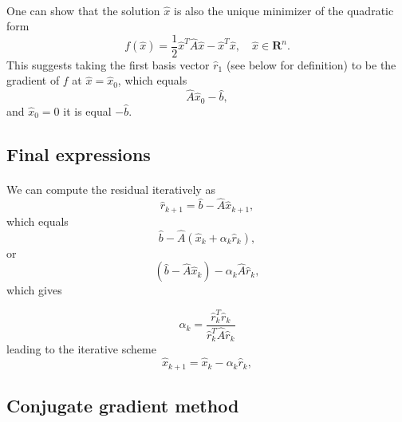 \documentclass[%
oneside,                 %
final,                   %
10pt]{article}
\begin{document}
\paragraph{}
One can show that the solution $\hat{x}$ is also the unique minimizer of the quadratic form
\begin{equation*}
  f(\hat{x}) = \frac{1}{2}\hat{x}^T\hat{A}\hat{x} - \hat{x}^T \hat{x} , \quad \hat{x}\in\mathbf{R}^n. 
\end{equation*}
This suggests taking the first basis vector $\hat{r}_1$ (see below for definition) 
to be the gradient of $f$ at $\hat{x}=\hat{x}_0$, 
which equals
\begin{equation*}
\hat{A}\hat{x}_0-\hat{b},
\end{equation*}
and 
$\hat{x}_0=0$ it is equal $-\hat{b}$.



\subsection*{Final expressions}

\paragraph{}
We can compute the residual iteratively as
\begin{equation*}
\hat{r}_{k+1}=\hat{b}-\hat{A}\hat{x}_{k+1},
 \end{equation*}
which equals
\begin{equation*}
\hat{b}-\hat{A}(\hat{x}_k+\alpha_k\hat{r}_k),
 \end{equation*}
or
\begin{equation*}
(\hat{b}-\hat{A}\hat{x}_k)-\alpha_k\hat{A}\hat{r}_k,
 \end{equation*}
which gives

\[
\alpha_k = \frac{\hat{r}_k^T\hat{r}_k}{\hat{r}_k^T\hat{A}\hat{r}_k}
\]
leading to the iterative scheme
\begin{equation*}
\hat{x}_{k+1}=\hat{x}_k-\alpha_k\hat{r}_{k},
 \end{equation*}



\subsection*{Conjugate gradient method}
\end{document}
